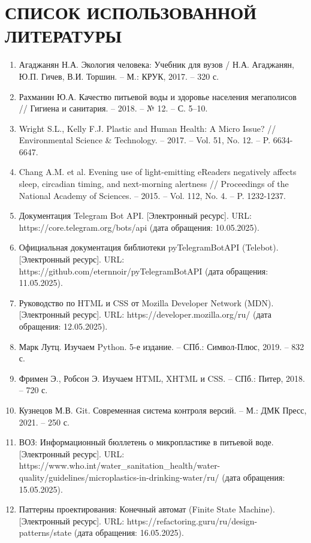 \section*{СПИСОК ИСПОЛЬЗОВАННОЙ ЛИТЕРАТУРЫ}

\begin{enumerate}
    \item Агаджанян Н.А. Экология человека: Учебник для вузов / Н.А. Агаджанян, Ю.П. Гичев, В.И. Торшин. – М.: КРУК, 2017. – 320 с.
    \item Рахманин Ю.А. Качество питьевой воды и здоровье населения мегаполисов // Гигиена и санитария. – 2018. – № 12. – С. 5–10.
    \item Wright S.L., Kelly F.J. Plastic and Human Health: A Micro Issue? // Environmental Science \& Technology. – 2017. – Vol. 51, No. 12. – P. 6634-6647.
    \item Chang A.M. et al. Evening use of light-emitting eReaders negatively affects sleep, circadian timing, and next-morning alertness // Proceedings of the National Academy of Sciences. – 2015. – Vol. 112, No. 4. – P. 1232-1237.
    \item Документация Telegram Bot API. [Электронный ресурс]. URL: https://core.telegram.org/bots/api (дата обращения: 10.05.2025).
    \item Официальная документация библиотеки pyTelegramBotAPI (Telebot). [Электронный ресурс]. URL: https://github.com/eternnoir/pyTelegramBotAPI (дата обращения: 11.05.2025).
    \item Руководство по HTML и CSS от Mozilla Developer Network (MDN). [Электронный ресурс]. URL: https://developer.mozilla.org/ru/ (дата обращения: 12.05.2025).
    \item Марк Лутц. Изучаем Python. 5-е издание. – СПб.: Символ-Плюс, 2019. – 832 с.
    \item Фримен Э., Робсон Э. Изучаем HTML, XHTML и CSS. – СПб.: Питер, 2018. – 720 с.
    \item Кузнецов М.В. Git. Современная система контроля версий. – М.: ДМК Пресс, 2021. – 250 с.
    \item ВОЗ: Информационный бюллетень о микропластике в питьевой воде. [Электронный ресурс]. URL: https://www.who.int/water\_sanitation\_health/water-quality/guidelines/microplastics-in-drinking-water/ru/ (дата обращения: 15.05.2025).
    \item Паттерны проектирования: Конечный автомат (Finite State Machine). [Электронный ресурс]. URL: https://refactoring.guru/ru/design-patterns/state (дата обращения: 16.05.2025).
\end{enumerate}
